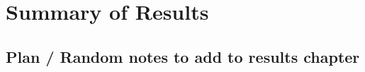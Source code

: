 





\chapter{Summary of Results}\label{ch:results}

\section{Plan / Random notes to add to results chapter}


